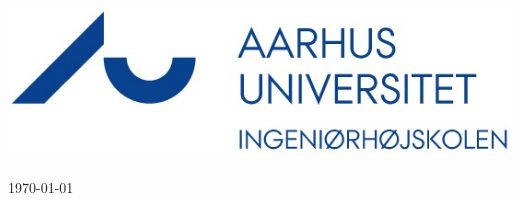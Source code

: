 \begin{center}
\ \\
\ \\
\ \\
\ \\
\ \\
\ \\
\ \\
\ \\
\ \\
\ \\
\ \\
\ \\
\ \\
\ \\
\ \\
\includegraphics[scale=2]{billeder/iha-logo}\\ %
 

\vfill %

{\large \today}\\[3cm] %
\end{center}

